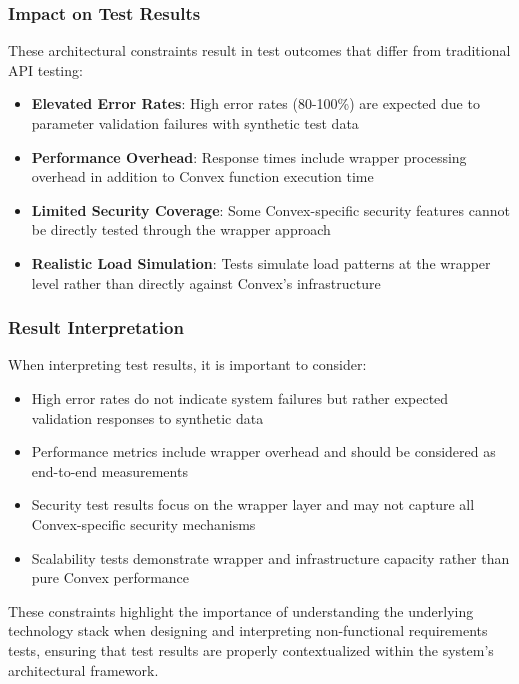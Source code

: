 \documentclass[a4paper,12pt]{article}
\begin{document}
\subsubsection{Impact on Test Results}
These architectural constraints result in test outcomes that differ from traditional API testing:

\begin{itemize}
    \item \textbf{Elevated Error Rates}: High error rates (80-100\%) are expected due to parameter validation failures with synthetic test data
    \item \textbf{Performance Overhead}: Response times include wrapper processing overhead in addition to Convex function execution time
    \item \textbf{Limited Security Coverage}: Some Convex-specific security features cannot be directly tested through the wrapper approach
    \item \textbf{Realistic Load Simulation}: Tests simulate load patterns at the wrapper level rather than directly against Convex's infrastructure
\end{itemize}

\subsubsection{Result Interpretation}
When interpreting test results, it is important to consider:
\begin{itemize}
    \item High error rates do not indicate system failures but rather expected validation responses to synthetic data
    \item Performance metrics include wrapper overhead and should be considered as end-to-end measurements
    \item Security test results focus on the wrapper layer and may not capture all Convex-specific security mechanisms
    \item Scalability tests demonstrate wrapper and infrastructure capacity rather than pure Convex performance
\end{itemize}

These constraints highlight the importance of understanding the underlying technology stack when designing and interpreting non-functional requirements tests, ensuring that test results are properly contextualized within the system's architectural framework.
\end{document}
